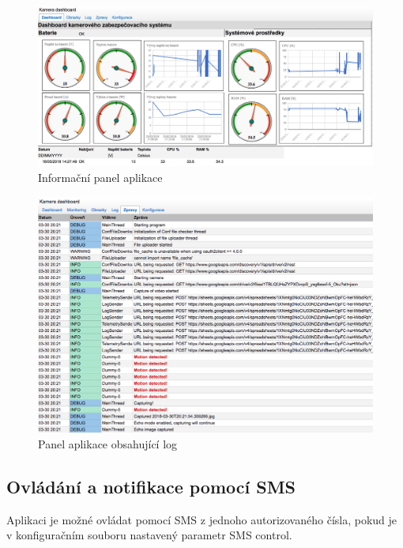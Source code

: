 \begin{figure}[h]
  \begin{center}
    \includegraphics[scale=0.3]{obrazky/dashboard2.png}
  \end{center}
  \caption{Informační panel aplikace}
\end{figure}

\begin{figure}[h]
  \begin{center}
    \includegraphics[scale=0.35]{obrazky/logy.png}
  \end{center}
  \caption{Panel aplikace obsahující log}
\end{figure}

\subsection*{Ovládání a notifikace pomocí SMS}

Aplikaci je možné ovládat pomocí SMS z jednoho autorizovaného čísla, pokud je v konfiguračním souboru nastavený parametr SMS control.


